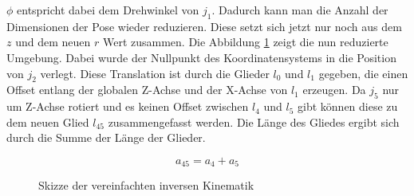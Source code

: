 $\phi$ entspricht dabei dem Drehwinkel von $j_1$. Dadurch kann man die Anzahl der Dimensionen der Pose wieder reduzieren. Diese setzt sich jetzt nur noch aus dem $z$ und dem neuen $r$ Wert zusammen. Die Abbildung \ref{fig:easyik} zeigt die nun reduzierte Umgebung. Dabei wurde der Nullpunkt des Koordinatensystems in die Position von $j_2$ verlegt. Diese Translation ist durch die Glieder $l_0$ und $l_1$ gegeben, die einen Offset entlang der globalen Z-Achse und der X-Achse von $l_1$ erzeugen. Da $j_5$ nur um Z-Achse rotiert und es keinen Offset zwischen $l_4$ und $l_5$ gibt können diese zu dem neuen Glied $l_{45}$ zusammengefasst werden. Die Länge des Gliedes ergibt sich durch die Summe der Länge der Glieder.

\begin{equation}
a_{45} = a_{4} +a_{5}
\label{eq:8}
\end{equation}

\begin{figure}[h]
	\centering
	\hfill
	\hfill
	\label{fig:easyik}
	\caption{Skizze der vereinfachten inversen Kinematik}
\end{figure}


